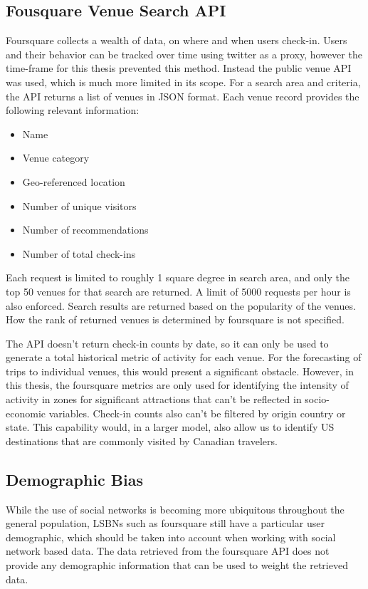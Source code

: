 \subsection{Fousquare Venue Search API}
Foursquare collects a wealth of data, on where and when users check-in. Users and their behavior can be tracked over time using twitter as a proxy, however the time-frame for this thesis prevented this method. Instead the public venue API was used, which is much more limited in its scope. For a search area and criteria, the API returns a list of venues in JSON format. Each venue record provides the following relevant information:
\begin{itemize}
\item Name
\item Venue category
\item Geo-referenced location
\item Number of unique visitors
\item Number of recommendations
\item Number of total check-ins
\end{itemize}

Each request is limited to roughly 1 square degree in search area, and only the top 50 venues for that search are returned. A limit of 5000 requests per hour is also enforced. Search results are returned based on the popularity of the venues. How the rank of returned venues is determined by foursquare is not specified. 

The API doesn't return check-in counts by date, so it can only be used to generate a total historical metric of activity for each venue. For the forecasting of trips to individual venues, this would present a significant obstacle. However, in this thesis, the foursquare metrics are only used for identifying the intensity of activity in zones for significant attractions that can't be reflected in socio-economic variables. Check-in counts also can't be filtered by origin country or state. This capability would, in a larger model, also allow us to identify US destinations that are commonly visited by Canadian travelers.

\subsection{Demographic Bias}
While the use of social networks is becoming more ubiquitous throughout the general population, LSBNs such as foursquare still have a particular user demographic, which should be taken into account when working with social network based data. The data retrieved from the foursquare API does not provide any demographic information that can be used to weight the retrieved data.

